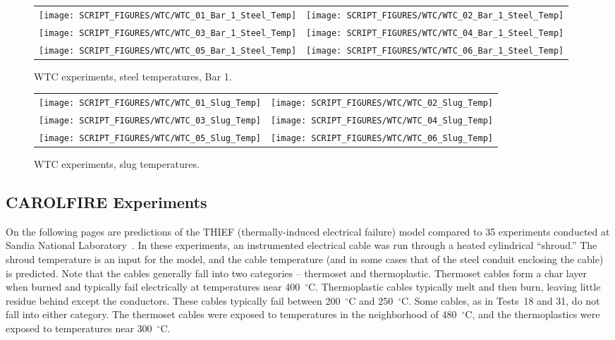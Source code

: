 \begin{figure}[p]
\begin{tabular*}{\textwidth}{l@{\extracolsep{\fill}}r}
\texttt{[image: SCRIPT\_FIGURES/WTC/WTC\_01\_Bar\_1\_Steel\_Temp]} &
\texttt{[image: SCRIPT\_FIGURES/WTC/WTC\_02\_Bar\_1\_Steel\_Temp]} \\
\texttt{[image: SCRIPT\_FIGURES/WTC/WTC\_03\_Bar\_1\_Steel\_Temp]} &
\texttt{[image: SCRIPT\_FIGURES/WTC/WTC\_04\_Bar\_1\_Steel\_Temp]} \\
\texttt{[image: SCRIPT\_FIGURES/WTC/WTC\_05\_Bar\_1\_Steel\_Temp]} &
\texttt{[image: SCRIPT\_FIGURES/WTC/WTC\_06\_Bar\_1\_Steel\_Temp]}
\end{tabular*}
\caption[WTC experiments, steel temperatures, Bar 1]{WTC experiments, steel temperatures, Bar 1.}
\label{NIST_WTC_Bar_1_Steel_Temp}
\end{figure}


\begin{figure}[p]
\begin{tabular*}{\textwidth}{l@{\extracolsep{\fill}}r}
\texttt{[image: SCRIPT\_FIGURES/WTC/WTC\_01\_Slug\_Temp]} &
\texttt{[image: SCRIPT\_FIGURES/WTC/WTC\_02\_Slug\_Temp]} \\
\texttt{[image: SCRIPT\_FIGURES/WTC/WTC\_03\_Slug\_Temp]} &
\texttt{[image: SCRIPT\_FIGURES/WTC/WTC\_04\_Slug\_Temp]} \\
\texttt{[image: SCRIPT\_FIGURES/WTC/WTC\_05\_Slug\_Temp]} &
\texttt{[image: SCRIPT\_FIGURES/WTC/WTC\_06\_Slug\_Temp]}
\end{tabular*}
\caption[WTC experiments, slug temperatures]{WTC experiments, slug temperatures.}
\label{NIST_WTC_Slug_Temp}
\end{figure}

\clearpage


\subsection{CAROLFIRE Experiments}

On the following pages are predictions of the THIEF (thermally-induced electrical failure) model compared to 35 experiments conducted at Sandia National Laboratory~\cite{CAROLFIRE}. In these experiments, an instrumented electrical cable was run through a heated cylindrical ``shroud.'' The shroud temperature is an input for the model, and the cable temperature (and in some cases that of the steel conduit enclosing the cable) is predicted. Note that the cables generally fall into two categories -- thermoset and thermoplastic. Thermoset cables form a char layer when burned and typically fail electrically at temperatures near 400~$^\circ$C. Thermoplastic cables typically melt and then burn, leaving little residue behind except the conductors. These cables typically fail between 200~$^\circ$C and 250~$^\circ$C. Some cables, as in Tests~18 and 31, do not fall into either category. The thermoset cables were exposed to temperatures in the neighborhood of 480~$^\circ$C, and the thermoplastics were exposed to temperatures near 300~$^\circ$C.


